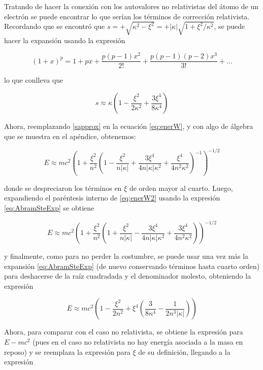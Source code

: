 \documentclass[a4paper, 12pt]{article} %
\begin{document}
Tratando de hacer la conexi\'on con los autovalores no relativistas del \'atomo de un electr\'on se puede encontrar lo que ser\'ian los t\'erminos de correcci\'on relativista. Recordando que se encontr\'o que $s=+\sqrt{\kappa^2 - \xi^2}=+|\kappa|\sqrt{1+\xi^2/\kappa^2}$, se puede hacer la expansi\'on usando la expresi\'on

\begin{equation}\label{eq:AbramSteExp}
(1+x)^p =1+px+\frac{p(p-1)x^2}{2!}+\frac{p(p-1)(p-2)x^3}{3!}+...
\end{equation}

lo que conlleva que

\begin{equation}\label{sapprox}
s\approx \kappa \left( 1-\frac{\xi^2}{2\kappa^2}+\frac{3\xi^4}{8\kappa^4}  \right)
\end{equation}

Ahora, reemplazando \ref{sapprox} en la ecuaci\'on \ref{eq:enerW}, y con algo de \'algebra que se muestra en el ap\'endice, obtenemos:

\begin{equation}\label{eq:enerW2}
E \approx mc^2 \left( 1+ \frac{\xi^2}{n^2} \left( 1-\frac{\xi^2}{n|\kappa|} + \frac{3\xi^4}{4n|\kappa|\kappa^2} + \frac{\xi^4}{4n^2\kappa^2} \right)^{-1}  \right)^{-1/2}
\end{equation}

donde se despreciaron los t\'erminos en $\xi$ de orden mayor al cuarto. Luego, expandiendo el par\'entesis interno de \ref{eq:enerW2} usando la expresi\'on \ref{eq:AbramSteExp} se obtiene 


\begin{equation}\label{eq:enerW3}
E \approx mc^2 \left( 1+ \frac{\xi^2}{n^2} \left( 1 + \frac{\xi^2}{n|\kappa|} - \frac{3\xi^4}{4n|\kappa|\kappa^2} + \frac{3\xi^4}{4n^2\kappa^2} \right)  \right)^{-1/2}
\end{equation}

y finalmente, como para no perder la costumbre, se puede usar una vez m\'as la expansi\'on \ref{eq:AbramSteExp} (de nuevo conservando t\'erminos hasta cuarto orden) para deshacerse de la ra\'iz cuadradada y el denominador molesto, obteniendo la expresi\'on

\begin{equation}\label{eq:enerW4}
E \approx mc^2 \left(  1- \frac{\xi^2}{2n^2} +\xi^4 \left( \frac{3}{8n^4}-\frac{1}{2n^3 |\kappa|} \right)  \right)
\end{equation}

Ahora, para comparar con el caso no relativista, se obtiene la expresi\'on para $E-mc^2$ (pues en el caso no relativista no hay energ\'ia asociada a la masa en reposo) y se reemplaza la expresi\'on para $\xi$ de su definici\'on, llegando a la expresi\'on 
\end{document}
